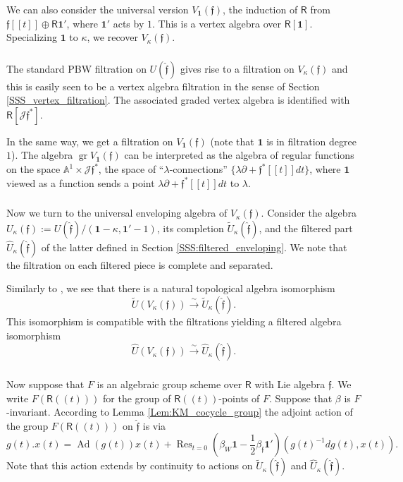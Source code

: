 \documentclass{amsart}
\theoremstyle{definition}
\newcommand{\sss}{\subsubsection{}}
\newcommand{\Ring}{\mathsf{R}}
\newcommand{\gr}{\operatorname{gr}}
\newcommand{\Jet}{\mathscr{J}}
\newcommand{\ff}{\mathfrak{f}}
\newcommand{\bone}{\mathbf{1}}
\numberwithin{equation}{section}
\begin{document}
We can also consider the universal version $V_{\bone}(\ff)$, the induction of $\Ring$ from $\ff[[t]]\oplus \Ring \mathbf{1}'$, where $\mathbf{1}'$ acts by $1$. This is a vertex algebra over $\Ring[\mathbf{1}]$. Specializing $\mathbf{1}$ to $\kappa$, we recover $V_\kappa(\ff)$. 

\sss
The standard PBW filtration on $U(\hat{\mathfrak{f}})$ gives rise to a filtration on $V_\kappa(\mathfrak{f})$ and this is easily seen to be a vertex algebra filtration in the sense of Section \ref{SSS_vertex_filtration}. The associated graded vertex algebra is identified with $\Ring[\Jet \ff^*]$. 

In the same way, we get a filtration on $V_{\bone}(\ff)$ (note that $\mathbf{1}$ is in filtration degree $1$). The algebra $\gr V_{\bone}(\ff)$ can be interpreted as the algebra of regular functions on the space $\mathbb{A}^1\times \Jet \ff^*$, the space of ``$\lambda$-connections'' $\{\lambda\partial+ \ff^*[[t]]dt\}$, where $\mathbf{1}$ viewed as a function sends a point $\lambda\partial+ \ff^*[[t]]dt$ to $\lambda$. 



 


\sss
Now we turn to the universal enveloping algebra of $V_\kappa(\ff)$.
Consider the algebra $U_\kappa(\mathfrak{f}):=U(\hat{\mathfrak{f}})/(\mathbf{1}-\kappa, \mathbf{1}'-1)$, its completion $\widetilde{U}_\kappa(\hat{\mathfrak{f}})$,
and the filtered part 
$\widehat{U}_\kappa(\hat{\mathfrak{f}})$ of the latter defined in Section \ref{SSS:filtered_enveloping}.
We note that the filtration on each filtered piece is complete and separated. 

Similarly to \cite[Lemma 3.2.2]{Frenkel_loop}, we see that there is a natural topological algebra isomorphism 
$$\widetilde{U}(V_\kappa(\mathfrak{f}))\xrightarrow{\sim} \widetilde{U}_\kappa(\hat{\mathfrak{f}}).$$
This isomorphism is compatible with the filtrations yielding a filtered algebra isomorphism
$$\widehat{U}(V_\kappa(\mathfrak{f}))\xrightarrow{\sim} \widehat{U}_\kappa(\hat{\mathfrak{f}}).$$

\sss Now suppose that $F$ is an algebraic group scheme over $\Ring$ with Lie algebra $\mathfrak{f}$. We write $F(\Ring(\!(t)\!))$ for the group of $\Ring(\!(t)\!)$-points of $F$. Suppose that $\beta$ is $F$-invariant. According to Lemma \ref{Lem:KM_cocycle_group} the adjoint action of the group  
$F(\Ring(\!(t))\!)$ on $\hat{\mathfrak{f}}$ is via
\begin{equation}\label{eq:loop_adjoint_action}
g(t).x(t)=\operatorname{Ad}(g(t))x(t)+ \operatorname{Res}_{t=0}(\beta_W\mathbf{1}-\frac{1}{2}\beta_{\ff}\mathbf{1}')(g(t)^{-1} dg(t),x(t)).
\end{equation}
Note that this action extends by continuity to actions on $\widetilde{U}_\kappa(\hat{\mathfrak{f}})$
and $\widehat{U}_\kappa(\hat{\mathfrak{f}})$. 
\end{document}
